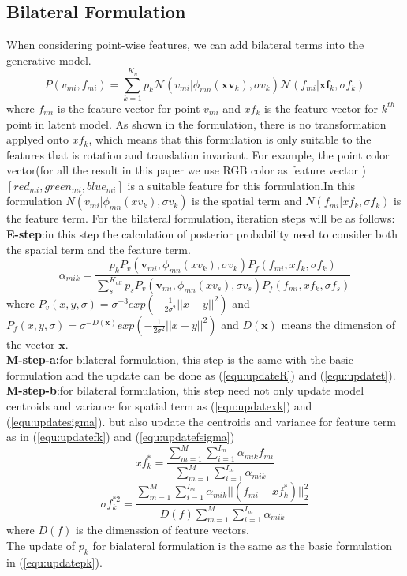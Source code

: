 \subsection{Bilateral Formulation}
When considering point-wise features, we can add bilateral terms into the generative model.
\begin{equation}
P(v_{mi},f_{mi})=\sum^{K_n}_{k=1}p_k\mathcal{N}(v_{mi}|\phi_{mn}(\pmb{xv}_k),\sigma v_k)\mathcal{N}(f_{mi}|\pmb{xf}_k,\sigma f_k)
\end{equation}
where $f_{mi}$ is the feature vector for point $v_{mi}$ and $xf_k$ is the feature vector for $k^{th}$ point in latent model. As shown in the formulation, there is no transformation applyed onto $xf_k$, which means that this formulation is only suitable to the features that is rotation and translation invariant. For example, the point color vector(for all the result in this paper we use RGB color as feature vector ) $[red_{mi},green_{mi},blue_{mi}]$ is a suitable feature for this formulation.In this formulation $N(v_{mi}|\phi_{mn}(xv_k),\sigma v_k)$ is the spatial term and $N(f_{mi}|xf_k,\sigma f_k)$ is the feature term.
For the bilateral formulation, iteration steps will be as follows:\\
\textbf{E-step}:in this step the calculation of posterior probability need to consider both the spatial term and the feature term.
\begin{equation}
\label{equ:bestep}
\alpha_{mik}=\frac{p_kP_v( \pmb v_{mi},\phi_{mn}(xv_k),\sigma v_k)P_f(f_{mi},xf_k,\sigma f_k)}{\sum_s^{K_{all}}p_sP_v( \pmb v_{mi},\phi_{mn}(xv_s),\sigma v_s)P_f(f_{mi},xf_k,\sigma f_s)}
\end{equation}
where $P_v(x,y,\sigma)=\sigma^{-3}exp(-\frac{1}{2\sigma^2}||x-y||^2)$ and $P_f(x,y,\sigma)=\sigma^{-D(\pmb x)}exp(-\frac{1}{2\sigma^2}||x-y||^2)$ and $D(\pmb x)$ means the dimension of the vector $\pmb x$.\\
\textbf{M-step-a:}for bilateral formulation, this step is the same with the basic formulation and the update can be done as (\ref{equ:updateR}) and (\ref{equ:updatet}).
\textbf{M-step-b}:for bilateral formulation, this step need not only update model centroids and variance for spatial term as (\ref{equ:updatexk}) and (\ref{equ:updatesigma}).
but also update the centroids and variance for feature term as in (\ref{equ:updatefk}) and (\ref{equ:updatefsigma})\\
\begin{equation}
\label{equ:updatefk}
xf_k^*=\frac{\sum_{m=1}^M\sum_{i=1}^{I_m}\alpha_{mik}f_{mi}}{\sum_{m=1}^M\sum_{i=1}^{I_m}\alpha_{mik}}
\end{equation}
\begin{equation}
\label{equ:updatefsigma}
\sigma f_k^{*2}=\frac{\sum_{m=1}^M\sum_{i=1}^{I_m}\alpha_{mik}||(f_{mi}-xf_k^*)||_2^2}{D(f)\sum_{m=1}^M\sum_{i=1}^{I_m}\alpha_{mik}}
\end{equation}
where $D(f)$ is the dimenssion of feature vectors.\\
The update of $p_k$ for bialateral formulation is the same as the basic formulation in (\ref{equ:updatepk}).
